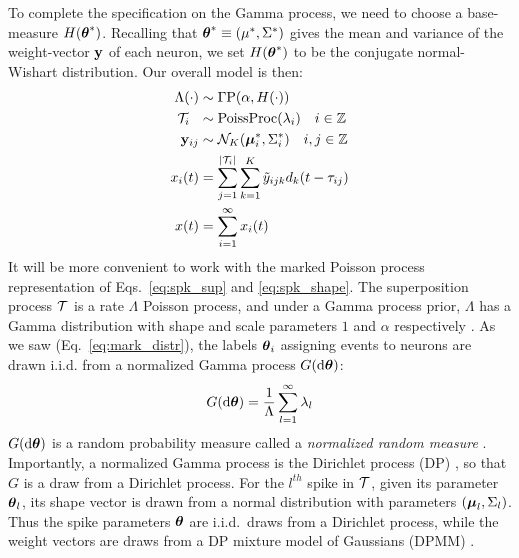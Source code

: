 To complete the specification on the Gamma process, we need to choose a base-measure $H(\boldsymbol{\theta}^*)$.
Recalling that $\boldsymbol{\theta}^* \equiv (\mu^*, \Sigma^*)$ gives the mean and variance of the weight-vector $\mathbf{y}$ of each neuron, we set $H(\boldsymbol{\theta}^*)$ 
to be the conjugate normal-Wishart distribution. Our overall model is then:
\begin{subequations}
\begin{align}
  \Lambda(\cdot) & \sim \Gamma \text{P}(\alpha, H(\cdot)) \\ %
  \mc{T}_i\ \  &\sim \text{PoissProc}(\lambda_i) \quad i \in \ZZ \\
  \by_{ij} & \sim \mc{N}_K(\mb{\mu}^*_i, \Sigma^*_i) \quad i,j \in \ZZ \\
  x_i(t) &= \sum_{j = 1}^{|\mc{T}_i|}  \sum_{k = 1}^{K} \tilde{y}_{ijk} d_k(t - \tau_{ij}) \\
  x(t)   &= \sum_{i=1}^{\infty} x_i(t)
\end{align}
\end{subequations}
% 
It will be more convenient to work with the marked Poisson process representation of Eqs.~\eqref{eq:spk_sup} and \eqref{eq:spk_shape}. 
The superposition process $\mathcal{T}$ is a rate $\Lambda$ Poisson process,
and under a Gamma process prior, $\Lambda$ has a Gamma distribution with shape and scale parameters $1$ and $\alpha$ respectively \citep{Ferguson73}.
As we saw (Eq.~\eqref{eq:mark_distr}), the labels $\boldsymbol{\theta}_i$ assigning events to neurons are drawn i.i.d. from a normalized Gamma 
process $G(\mathrm{d} \boldsymbol{\theta})$:
\begin{align}
 G(\mathrm{d} \boldsymbol{\theta}) = \frac{1}{\Lambda} \sum_{l=1}^{\infty} \lambda_l
\end{align}
$G(\mathrm{d} \boldsymbol{\theta})$ is a random probability measure called a \emph{normalized random measure} \citep{JamesLP09}. Importantly, a 
normalized Gamma process is the Dirichlet process (DP) \citep{Ferguson73}, so that $G$ is a draw from a Dirichlet process. For the $l^{th}$ spike in $\mathcal{T}$, given its 
parameter $\boldsymbol{\theta}_l$, its shape vector is drawn from a normal distribution
with parameters $(\boldsymbol{\mu}_{l}, \Sigma_{l})$. Thus the spike parameters $\boldsymbol{\theta}$ are i.i.d.\ draws from a Dirichlet process, while the weight vectors are
draws from a DP mixture model of Gaussians (DPMM) \citep{Lo1984}.

